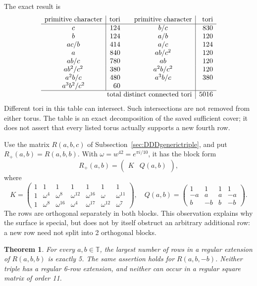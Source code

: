 \documentclass[11pt,a4paper]{article}
\newtheorem{theorem}{Theorem}[section]
\theoremstyle{plain}
\theoremstyle{definition}
\theoremstyle{plain}
\begin{document}
The exact result is
\[
\begin{array}{c|r@{\qquad}c|r}
\text{primitive character}&\text{tori}&\text{primitive character}&\text{tori}\\\hline
c&124&b/c&830\\
b&124&a/b&120\\
ac/b&414&a/c&124\\
a&840&ab/c^2&120\\
ab/c&780&ab&120\\
ab^2/c^2&380&a^2b/c^2&120\\
a^2b/c&480&a^3b/c&380\\
a^3b^2/c^2&60&&\\\hline
\multicolumn{3}{r|}{\text{total distinct connected tori}}&5016
\end{array}
\]
Different tori in this table can intersect. Such intersections are not removed from either torus. The table is an exact decomposition of the saved sufficient cover; it does not assert that every listed torus actually supports a new fourth row.

\medskip
Use the matrix $R(a,b,c)$ of Subsection~\ref{sec:DDDgenerictriple}, and put $R_+(a,b)=R(a,b,b)$. With $\omega=w^{42}=e^{\pi i/10}$, it has the block form
\[
R_+(a,b)=\left(\begin{array}{c|c} K&Q(a,b)\end{array}\right),
\]
where
\begin{equation*}
K=\begin{pmatrix}
1&1&1&1&1&1&1\\
1&\omega^{4}&\omega^{8}&\omega^{12}&\omega^{16}&\omega&\omega^{11}\\
1&\omega^{8}&\omega^{16}&\omega^{4}&\omega^{17}&\omega^{12}&\omega^{7}
\end{pmatrix},
\quad
Q(a,b)=\begin{pmatrix}
1&1&1&1\\
-a&a&a&-a\\
b&-b&b&-b
\end{pmatrix}.
\end{equation*}
The rows are orthogonal separately in both blocks. This observation explains why the surface is special, but does not by itself obstruct an arbitrary additional row: a new row need not split into 2 orthogonal blocks.

\par\addvspace{\medskipamount}\noindent
\begin{minipage}{\linewidth}
\begin{theorem}\label{n11_surface:main}
For every $a,b\in\mathbb T$, the largest number of rows in a regular extension of $R(a,b,b)$ is exactly 5. The same assertion holds for $R(a,b,-b)$. Neither triple has a regular 6-row extension, and neither can occur in a regular square matrix of order 11.
\end{theorem}
\end{minipage}
\par\addvspace{\medskipamount}
\end{document}
